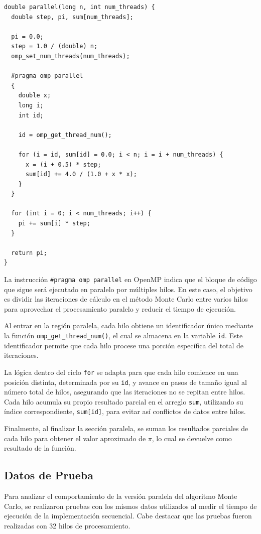 \documentclass[a4paper, 10pt, onecolumn]{IEEEtran}
\begin{document}
\begin{lstlisting}[caption={Implementación Paralela de Monte Carlo en C++}, label={lst:parallel}]
double parallel(long n, int num_threads) {
  double step, pi, sum[num_threads];
  
  pi = 0.0;
  step = 1.0 / (double) n;
  omp_set_num_threads(num_threads);
  
  #pragma omp parallel
  {
    double x;
    long i;
    int id;
    
    id = omp_get_thread_num();
    
    for (i = id, sum[id] = 0.0; i < n; i = i + num_threads) {
      x = (i + 0.5) * step;
      sum[id] += 4.0 / (1.0 + x * x);
    }
  }
  
  for (int i = 0; i < num_threads; i++) {
    pi += sum[i] * step;
  }
  
  return pi;
}
\end{lstlisting}

La instrucción \texttt{\#pragma omp parallel} en OpenMP indica que el bloque de código que sigue será ejecutado en paralelo por múltiples hilos. En este caso, el objetivo es dividir las iteraciones de cálculo en el método Monte Carlo entre varios hilos para aprovechar el procesamiento paralelo y reducir el tiempo de ejecución.

Al entrar en la región paralela, cada hilo obtiene un identificador único mediante la función \texttt{omp\_get\_thread\_num()}, el cual se almacena en la variable \texttt{id}. Este identificador permite que cada hilo procese una porción específica del total de iteraciones.

La lógica dentro del ciclo \texttt{for} se adapta para que cada hilo comience en una posición distinta, determinada por su \texttt{id}, y avance en pasos de tamaño igual al número total de hilos, asegurando que las iteraciones no se repitan entre hilos. Cada hilo acumula su propio resultado parcial en el arreglo \texttt{sum}, utilizando su índice correspondiente, \texttt{sum[id]}, para evitar así conflictos de datos entre hilos.

Finalmente, al finalizar la sección paralela, se suman los resultados parciales de cada hilo para obtener el valor aproximado de $\pi$, lo cual se devuelve como resultado de la función.

\subsection{Datos de Prueba}
Para analizar el comportamiento de la versión paralela del algoritmo Monte Carlo, se realizaron pruebas con los mismos datos utilizados al medir el tiempo de ejecución de la implementación secuencial. Cabe destacar que las pruebas fueron realizadas con 32 hilos de procesamiento.
\end{document}
